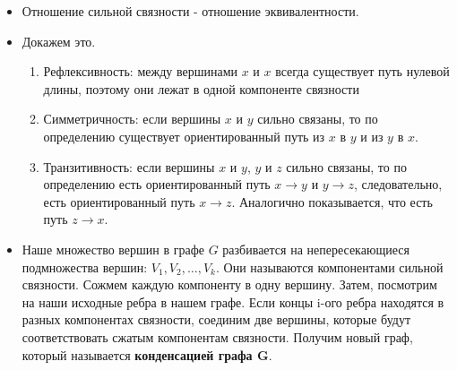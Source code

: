 \documentclass{article}
\begin{document}
    \begin{itemize}
    \item 
    Отношение сильной связности - отношение эквивалентности. 

    \item 
    Докажем это.
    \begin{enumerate}
    \item Рефлексивность: между вершинами $x$ и $x$ всегда существует путь нулевой длины, поэтому они лежат в одной компоненте связности
    \item Симметричность: если вершины $x$ и $y$ сильно связаны, то по определению существует ориентированный путь из $x$ в $y$ и из $y$ в $x$. 
    \item Транзитивность: если вершины $x$ и $y$, $y$ и $z$ сильно связаны, то по определению есть ориентированный путь $x \to y$ и $y \to z$, следовательно, есть ориентированный путь $x \to z$. Аналогично показывается, что есть путь $z \to x$.
    \end{enumerate}

    \item
    Наше множество вершин в графе $G$ разбивается на непересекающиеся подмножества вершин: $V_1, V_2, \dots, V_k$. Они называются компонентами сильной связности. Сожмем каждую компоненту в одну вершину. Затем, посмотрим на наши исходные ребра в нашем графе. Если концы i-ого ребра находятся в разных компонентах связности, соединим две вершины, которые будут соответствовать сжатым компонентам связности. Получим новый граф, который называется \textbf{конденсацией графа G}.
    \end{itemize}
\end{document}
